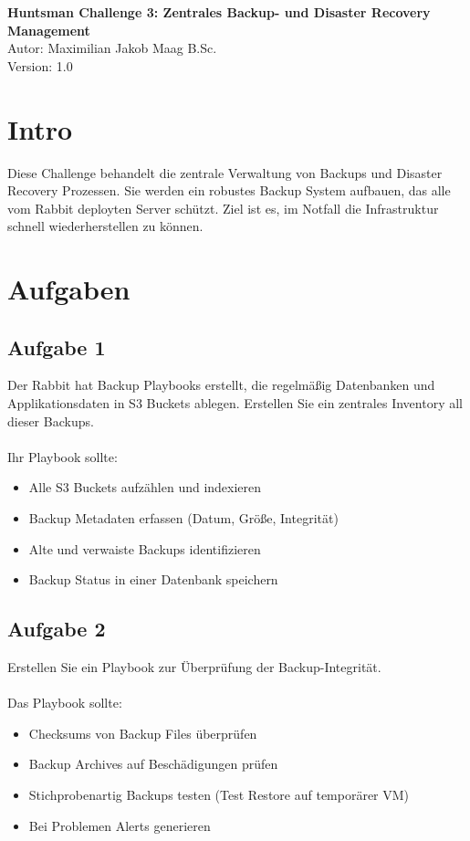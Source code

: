 \documentclass{article}
\begin{document}
    \begin{center}
        \Large \textbf{Huntsman Challenge 3: Zentrales Backup- und Disaster Recovery Management} \\ [6pt]
        \normalsize
        Autor: Maximilian Jakob Maag B.Sc. \\
        Version: 1.0
    \end{center}

    \section{Intro}
    Diese Challenge behandelt die zentrale Verwaltung von Backups und Disaster Recovery Prozessen.
    Sie werden ein robustes Backup System aufbauen, das alle vom Rabbit deployten Server schützt.
    Ziel ist es, im Notfall die Infrastruktur schnell wiederherstellen zu können.

    \section{Aufgaben}

    \subsection{Aufgabe 1}
    Der Rabbit hat Backup Playbooks erstellt, die regelmäßig Datenbanken und Applikationsdaten in S3 Buckets ablegen.
    Erstellen Sie ein zentrales Inventory all dieser Backups.
    \\ \\
    Ihr Playbook sollte:
    \begin{itemize}
        \item Alle S3 Buckets aufzählen und indexieren
        \item Backup Metadaten erfassen (Datum, Größe, Integrität)
        \item Alte und verwaiste Backups identifizieren
        \item Backup Status in einer Datenbank speichern
    \end{itemize}

    \subsection{Aufgabe 2}
    Erstellen Sie ein Playbook zur Überprüfung der Backup-Integrität.
    \\ \\
    Das Playbook sollte:
    \begin{itemize}
        \item Checksums von Backup Files überprüfen
        \item Backup Archives auf Beschädigungen prüfen
        \item Stichprobenartig Backups testen (Test Restore auf temporärer VM)
        \item Bei Problemen Alerts generieren
    \end{itemize}
\end{document}
